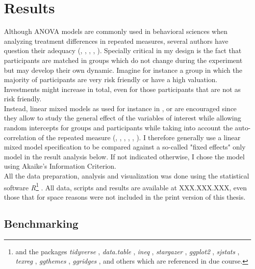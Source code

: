 \chapter{Results}
\label{ch:results}
\thispagestyle{fancy}

    Although ANOVA models are commonly used in behavioral sciences when analyzing treatment differences in repeated measures, several authors have question their adequacy (\cite{camilli1987}, \cite{vasey1987}, \cite{jaeger2008}, \cite{locker2007}, \cite{krueger2004}). Specially critical in my design is the fact that participants are matched in groups which do not change during the experiment but may develop their own dynamic. Imagine for instance a group in which the majority of participants are very risk friendly or have a high valuation. Investments might increase in total, even for those participants that are not as risk friendly.\\ 
    
    Instead, linear mixed models as used for instance in \cite{szaszi2018}, \cite{holsen2009} or \cite{yue2010} are encouraged since they allow to study the general effect of the variables of interest while allowing random intercepts for groups and participants while taking into account the auto-correlation of the repeated measure (\cite{galecki2013}, \cite{bolker2009}, \cite{mcculloch2015}, \cite{barr2013}, \cite{baayen2008}, \cite{fitzmaurice2015}). I therefore generally use a linear mixed model specification to be compared against a so-called "fixed effects" only model in the result analysis below. If not indicated otherwise, I chose the model using Akaike's Information Criterion.\\

    All the data preparation, analysis and visualization was done using the statistical software \textit{R}\footnote{and the packages \textit{tidyverse} \citep{wickham2017b}, \textit{data.table} \citep{dowle2018}, \textit{ineq} \citep{zeileis2014}, \textit{stargazer} \citep{hlavac2018}, \textit{ggplot2} \citep{wickham2016}, \textit{sjstats} \citep{ludecke2018}, \textit{texreg} \citep{leifeld2013}, \textit{ggthemes} \citep{arnold2018}, \textit{ggridges} \citep{wilke2018}, and others which are referenced in due course.} \citep{rcoreteam2014}. All data, scripts and results are available at XXX.XXX.XXX, even those that for space reasons were not included in the print version of this thesis.

\section{Benchmarking }

